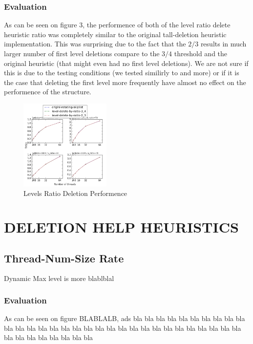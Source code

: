 \documentclass{article}
\begin{document}
\subsubsection{Evaluation}
\label{sssec:rls-evl}

As can be seen on figure 3, the performence of both of the level ratio delete heuristic ratio was completely similar to the original tall-deletion heuristic implementation. This was surprising due to the fact that the $2/3$ results in much larger number of first level deletions compare to the $3/4$ threshold and the original heuristic (that might even had no first level deletions). We are not sure if this is due to the testing conditions (we tested similirly to \cite{C1} and more) or if it is the case that deleting the first level more frequently have almost no effect on the performence of the structure.

\begin{figure}
	\caption{Levels Ratio Deletion Performence}
	\centering
	\includegraphics[width=0.4\textwidth]{level-delete-by-ratio_plot}
\end{figure}


\section{DELETION HELP HEURISTICS}
\label{sec:dhh}

\subsection{Thread-Num-Size Rate}
\label{ssec:tns}

Dynamic Max level is more blablblal

\subsubsection{Evaluation}
\label{sssec:tns-evl}

As can be seen on figure BLABLALB, ads
bla bla bla bla bla bla
bla bla bla bla bla 
bla bla bla bla bla bla
bla bla bla bla bla 
bla bla bla bla bla bla
bla bla bla bla bla 
bla bla bla bla bla bla
\end{document}
